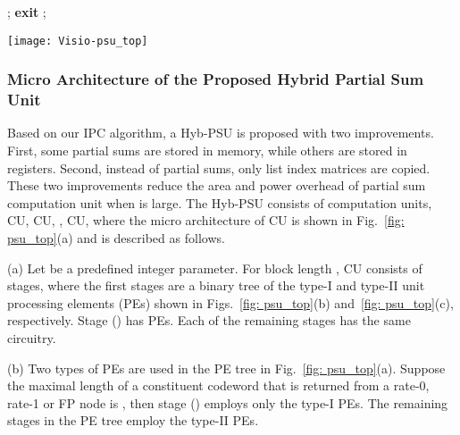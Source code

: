 \documentclass[journal]{IEEEtran}
\begin{document}
\begin{algorithm}
\DontPrintSemicolon
\label{algo: psum_comp}

\Input{}
\BlankLine

\For{ \KwTo } {
\For{ \KwTo } {
 {
; \;
}\lElse {

}
}
}
 {
\textbf{exit}
}
\For{ \KwTo } {
\For{ \KwTo } {
\For{ \KwTo } {
; \;
\If{}{
; \;
\;
}\Else{
; \;
\;
}
}
}
}
\caption{Index Based Partial Sum Computation (IPC) Algorithm}
\end{algorithm}





\begin{figure*} [hbt]
\centering
\texttt{[image: Visio-psu\_top]}
  \caption{(a) Top architecture of CU. (b) Type-I PE. (c) Type-II PE. (d) Inputs and outputs of the CN.}\label{fig: psu_top}
\end{figure*}

\subsubsection{Micro Architecture of the Proposed Hybrid Partial Sum Unit}
Based on our IPC algorithm, a Hyb-PSU is proposed with two improvements. First, some partial sums are stored in memory, while others are stored in registers. Second, instead of partial sums, only list index matrices are copied. These two improvements reduce the area and power overhead of partial sum computation unit when  is large. The Hyb-PSU consists of  computation units, CU, CU, , CU, where the micro architecture of CU is shown in Fig.~\ref{fig: psu_top}(a) and is described as follows.

(a) Let  be a predefined integer parameter. For block length , CU consists of  stages, where the first  stages are a binary tree of the type-I and type-II unit processing elements (PEs) shown in Figs.~\ref{fig: psu_top}(b) and~\ref{fig: psu_top}(c), respectively. Stage  () has  PEs. Each of the remaining  stages has the same circuitry.

(b) Two types of PEs are used in the PE tree in Fig.~\ref{fig: psu_top}(a). Suppose the maximal length of a constituent codeword that is returned from a rate-0, rate-1 or FP node is , then stage  () employs only the type-I PEs. The remaining stages in the PE tree employ the type-II PEs.
\end{document}
